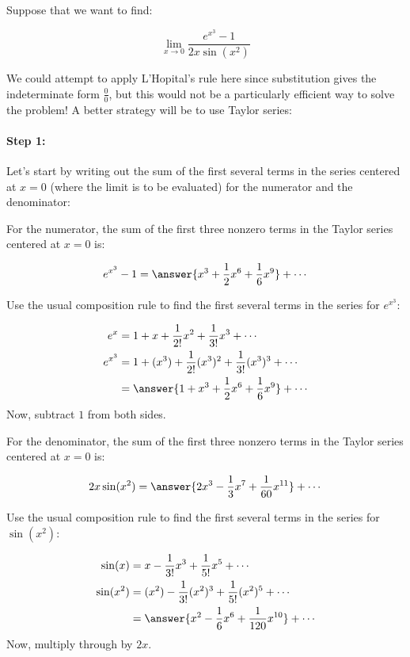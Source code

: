 \documentclass{ximera}
\author{Jim Talamo}
\begin{document}
\begin{exercise}
Suppose that we want to find:

\[
\lim_{x \to 0} \frac{e^{x^3}-1}{2x \sin(x^2)}
\]


We could attempt to apply L'Hopital's rule here since substitution gives the indeterminate form $\frac{0}{0}$, but this would not be a particularly efficient way to solve the problem!  A better strategy will be to use Taylor series:


\paragraph{Step 1:} Let's start by writing out the sum of the first several terms in the series centered at $x=0$ (where the limit is to be evaluated) for the numerator and the denominator:

\begin{exercise}
For the numerator, the sum of the first three nonzero terms in the Taylor series centered at $x=0$ is:

\[
e^{x^3}-1 = \answer{x^3+\frac{1}{2}x^6+\frac{1}{6}x^9} +\cdots
\]

\begin{hint}
Use the usual composition rule to find the first several terms in the series for $e^{x^3}$:

\begin{align*}
e^x &= 1+x+\frac{1}{2!}x^2+\frac{1}{3!}x^3+\cdots \\
e^{x^3} &= 1+(x^3)+\frac{1}{2!}(x^3)^2+\frac{1}{3!}(x^3)^3+\cdots \\
&= \answer{1+x^3+\frac{1}{2}x^6+\frac{1}{6}x^9}+\cdots \\
\end{align*}
Now, subtract $1$ from both sides.
\end{hint}
\end{exercise}


\begin{exercise}
For the denominator, the sum of the first three nonzero terms in the Taylor series centered at $x=0$ is:

\[
2x \sin(x^2) = \answer{2x^3-\frac{1}{3}x^7+\frac{1}{60}x^{11}} +\cdots
\]

\begin{hint}
Use the usual composition rule to find the first several terms in the series for $\sin(x^2)$:

\begin{align*}
\sin(x) &= x-\frac{1}{3!}x^3+\frac{1}{5!}x^5+\cdots \\
\sin(x^2) &= (x^2)-\frac{1}{3!}(x^2)^3+\frac{1}{5!}(x^2)^5+\cdots \\
&= \answer{x^2-\frac{1}{6}x^6+\frac{1}{120}x^{10}}+\cdots \\
\end{align*}
Now, multiply through by $2x$.
\end{hint}
\end{exercise}



\end{exercise}
\end{document}
